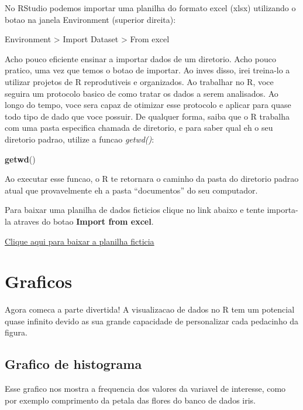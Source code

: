\documentclass[
]{book}
\newenvironment{Shaded}{\begin{snugshade}}{\end{snugshade}}
\newcommand{\FunctionTok}[1]{\textcolor[rgb]{0.13,0.29,0.53}{\textbf{#1}}}
\newcommand{\NormalTok}[1]{#1}
\begin{document}
No RStudio podemos importar uma planilha do formato excel (xlsx) utilizando o botao na janela Environment (superior direita):

Environment \textgreater{} Import Dataset \textgreater{} From excel

Acho pouco eficiente ensinar a importar dados de um diretorio. Acho pouco pratico, uma vez que temos o botao de importar. Ao inves disso, irei treina-lo a utilizar projetos de R reprodutiveis e organizados. Ao trabalhar no R, voce seguira um protocolo basico de como tratar os dados a serem analisados. Ao longo do tempo, voce sera capaz de otimizar esse protocolo e aplicar para quase todo tipo de dado que voce possuir. De qualquer forma, saiba que o R trabalha com uma pasta especifica chamada de diretorio, e para saber qual eh o seu diretorio padrao, utilize a funcao \emph{getwd()}:

\begin{Shaded}
\begin{Highlighting}[]
\FunctionTok{getwd}\NormalTok{()}
\end{Highlighting}
\end{Shaded}

Ao executar esse funcao, o R te retornara o caminho da pasta do diretorio padrao atual que provavelmente eh a pasta ``documentos'' do seu computador.

Para baixar uma planilha de dados ficticios clique no link abaixo e tente importa-la atraves do botao \textbf{Import from excel}.

\href{data/fake_data.xlsx}{Clique aqui para baixar a planilha ficticia}

\hypertarget{graficos}{%
\section{Graficos}\label{graficos}}

Agora comeca a parte divertida! A visualizacao de dados no R tem um potencial quase infinito devido as sua grande capacidade de personalizar cada pedacinho da figura.

\hypertarget{grafico-de-histograma}{%
\subsection{Grafico de histograma}\label{grafico-de-histograma}}

Esse grafico nos mostra a frequencia dos valores da variavel de interesse, como por exemplo comprimento da petala das flores do banco de dados iris.
\end{document}
